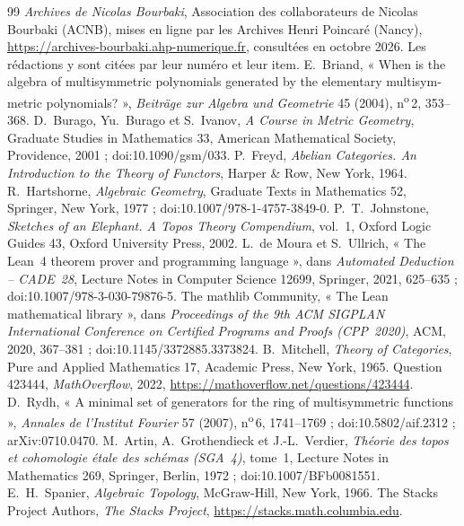 \documentclass[11pt]{article}
\theoremstyle{plain}
\theoremstyle{definition}
\theoremstyle{plain}
\theoremstyle{definition}
\theoremstyle{remark}
\renewcommand{\_}{\bkunderscore\allowbreak}
\begin{document}
\begin{thebibliography}{99}\small
{} \emph{Archives de Nicolas Bourbaki}, Association des collaborateurs de Nicolas Bourbaki (ACNB), mises en ligne par les Archives Henri Poincaré (Nancy), \url{https://archives-bourbaki.ahp-numerique.fr}, consultées en octobre 2026. Les rédactions y sont citées par leur numéro et leur item.
 E.~Briand, « \textenglish{When is the algebra of multisymmetric polynomials generated by the elementary multisymmetric polynomials?} », \emph{Beiträge zur Algebra und Geometrie} 45 (2004), n\textsuperscript{o}\,2, 353--368.
 D.~Burago, Yu.~Burago et S.~Ivanov, \emph{A Course in Metric Geometry}, Graduate Studies in Mathematics 33, American Mathematical Society, Providence, 2001 ; doi:10.1090/gsm/033.
 P.~Freyd, \emph{Abelian Categories. An Introduction to the Theory of Functors}, Harper \& Row, New York, 1964.
 R.~Hartshorne, \emph{Algebraic Geometry}, Graduate Texts in Mathematics 52, Springer, New York, 1977 ; doi:10.1007/978-1-4757-3849-0.
 P.~T.~Johnstone, \emph{Sketches of an Elephant. A Topos Theory Compendium}, vol.~1, Oxford Logic Guides 43, Oxford University Press, 2002.
 L.~de Moura et S.~Ullrich, « The Lean~4 theorem prover and programming language », dans \emph{Automated Deduction -- CADE~28}, Lecture Notes in Computer Science 12699, Springer, 2021, 625--635 ; doi:10.1007/978-3-030-79876-5\_37.
 The mathlib Community, « The Lean mathematical library », dans \emph{Proceedings of the 9th ACM SIGPLAN International Conference on Certified Programs and Proofs (CPP~2020)}, ACM, 2020, 367--381 ; doi:10.1145/3372885.3373824.
 B.~Mitchell, \emph{Theory of Categories}, Pure and Applied Mathematics 17, Academic Press, New York, 1965.
 Question 423444, \emph{MathOverflow}, 2022, \url{https://mathoverflow.net/questions/423444}.
 D.~Rydh, « A minimal set of generators for the ring of multisymmetric functions », \emph{Annales de l'Institut Fourier} 57 (2007), n\textsuperscript{o}\,6, 1741--1769 ; doi:10.5802/aif.2312 ; arXiv:0710.0470.
 M.~Artin, A.~Grothendieck et J.-L.~Verdier, \emph{Théorie des topos et cohomologie étale des schémas (SGA~4)}, tome~1, Lecture Notes in Mathematics 269, Springer, Berlin, 1972 ; doi:10.1007/BFb0081551.
 E.~H.~Spanier, \emph{Algebraic Topology}, McGraw-Hill, New York, 1966.
 The Stacks Project Authors, \emph{The Stacks Project}, \url{https://stacks.math.columbia.edu}.

\end{thebibliography}
\end{document}
